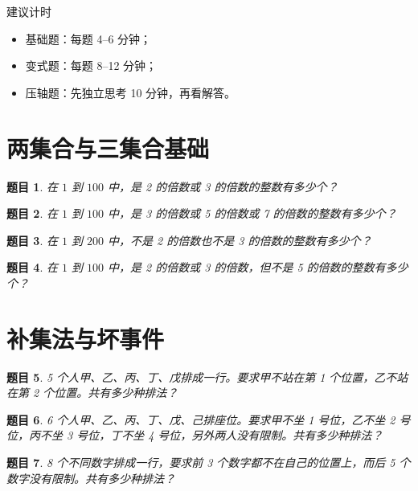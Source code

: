 \documentclass[11pt,a4paper,fontset=fandol]{ctexart}
\theoremstyle{formalexample}
\newtheorem{exercise}{题目}[section]
\begin{document}
\begin{notebox}{建议计时}
\begin{itemize}
  \item 基础题：每题 4--6 分钟；
  \item 变式题：每题 8--12 分钟；
  \item 压轴题：先独立思考 10 分钟，再看解答。
\end{itemize}
\end{notebox}

\section{两集合与三集合基础}

\begin{exercise}
在 $1$ 到 $100$ 中，是 2 的倍数或 3 的倍数的整数有多少个？
\end{exercise}

\begin{exercise}
在 $1$ 到 $100$ 中，是 3 的倍数或 5 的倍数或 7 的倍数的整数有多少个？
\end{exercise}

\begin{exercise}
在 $1$ 到 $200$ 中，不是 2 的倍数也不是 3 的倍数的整数有多少个？
\end{exercise}

\begin{exercise}
在 $1$ 到 $100$ 中，是 2 的倍数或 3 的倍数，但不是 5 的倍数的整数有多少个？
\end{exercise}

\section{补集法与坏事件}

\begin{exercise}
5 个人甲、乙、丙、丁、戊排成一行。要求甲不站在第 1 个位置，乙不站在第 2 个位置。共有多少种排法？
\end{exercise}

\begin{exercise}
6 个人甲、乙、丙、丁、戊、己排座位。要求甲不坐 1 号位，乙不坐 2 号位，丙不坐 3 号位，丁不坐 4 号位，另外两人没有限制。共有多少种排法？
\end{exercise}

\begin{exercise}
8 个不同数字排成一行，要求前 3 个数字都不在自己的位置上，而后 5 个数字没有限制。共有多少种排法？
\end{exercise}
\end{document}

